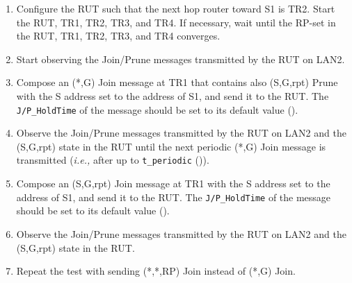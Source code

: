 \documentclass[11pt]{report}
\newcommand{\ie}{\emph{i.e.,}\xspace}
\begin{document}
\begin{enumerate}

  \item Configure the RUT such that the next hop router toward S1 is
  TR2. Start the RUT, TR1, TR2, TR3, and TR4. If necessary, wait until the
  RP-set in the RUT, TR1, TR2, TR3, and TR4 converges.

  \item Start observing the Join/Prune messages transmitted by the RUT on
  LAN2.

  \item Compose an (*,G) Join message at TR1 that contains also (S,G,rpt)
  Prune with the S address set to the address of S1, and send it to the RUT.
  The \verb=J/P_HoldTime= of the message should be set to its default
  value ({\PimsmJPHoldTime}).

  \item Observe the Join/Prune messages transmitted by the RUT on LAN2 and the
  (S,G,rpt) state in the RUT until the next periodic (*,G) Join message is
  transmitted (\ie after up to \verb=t_periodic= ({\PimsmTPeriodic})).

  \item Compose an (S,G,rpt) Join message at TR1 with the S address set to the
  address of S1, and send it to the RUT. 
  The \verb=J/P_HoldTime= of the message should be set to its default
  value ({\PimsmJPHoldTime}).

  \item Observe the Join/Prune messages transmitted by the RUT on LAN2 and the
  (S,G,rpt) state in the RUT.

  \item Repeat the test with sending (*,*,RP) Join instead of (*,G) Join.

\end{enumerate}

\end{document}
